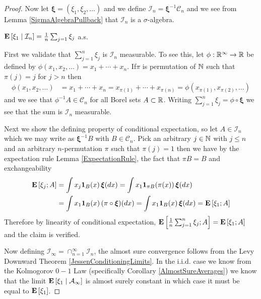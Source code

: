 \begin{proof}
Now let $\boldsymbol{\xi} = (\xi_1, \xi_2, \dotsc)$ and we define $\mathcal{I}_n = \boldsymbol{\xi}^{-1} \mathcal{C}_n$ and we see from Lemma \ref{SigmaAlgebraPullback} that $\mathcal{I}_n$ is a $\sigma$-algebra.
\begin{clm}$\cexpectationlong{\mathcal{I}_n}{\xi_1} = \frac{1}{n} \sum_{j=1} \xi_j$ a.s.
\end{clm}
First we validate that $\sum_{j=1}^n \xi_j$ is $\mathcal{I}_n$ measurable.  To see this, let $\phi : \reals^\infty \to \reals$ be defined by $\phi(x_1, x_2, \dots) = x_1 + \dotsb + x_n$.  If$\pi$ is permutation of $\naturals$ such that $\pi(j) = j$ for $j > n$ then 
\begin{align*}
\phi(x_1, x_2, \dotsc ) &= x_1 + \dotsb + x_n = x_{\pi(1)} + \dotsb + x_{\pi(n)} = \phi(x_{\pi(1)}, x_{\pi(2)}, \dotsc)
\end{align*}
and we see that $\phi^{-1} A \in \mathcal{C}_n$ for all Borel sets $A \subset \reals$.  Writing $\sum_{j=1}^n \xi_j = \phi \circ \boldsymbol{\xi}$ we see that the sum is $\mathcal{I}_n$ measurable.  

Next we show the defining property of conditional expectation, so let $A \in \mathcal{I}_n$ which we may write as $\boldsymbol{\xi}^{-1} B$ with $B \in \mathcal{C}_n$.  Pick an arbitrary $j \in \naturals$ with $j \leq n$ and an arbitrary $n$-permutation $\pi$ such that $\pi (j) = 1$ then we have by the expectation rule Lemma \ref{ExpectationRule}, the fact that $\pi B = B$ and exchangeability
\begin{align*}
\expectation{\xi_j ; A} 
&= \int x_j \characteristic{B}(x) \, \boldsymbol{\xi}(dx) 
= \int x_1 \characteristic{\pi B}(\pi(x)) \, \boldsymbol{\xi}(dx) \\
&= \int x_1 \characteristic{B}(x) \, (\pi \circ \boldsymbol{\xi})(dx) 
= \int x_1 \characteristic{B}(x) \, \boldsymbol{\xi}(dx) 
= \expectation{\xi_1 ; A}
\end{align*}
Therefore by linearity of conditional expectation, $\expectation{\frac{1}{n} \sum_{j=1}^n \xi_j ; A} = \expectation{\xi_1 ; A}$ and the claim is verified.

Now defining $\mathcal{I}_\infty = \cap_{n=1}^\infty \mathcal{I}_n$, the almost sure convergence follows from the Levy Downward Theorem \ref{JessenConditioningLimits}.  In the i.i.d. case we know from the Kolmogorov $0-1$ Law (specifically Corollary \ref{AlmostSureAverages}) we know that the limit $\cexpectationlong{\mathcal{A}_\infty}{\xi_1}$ is almost surely constant in which case it must be equal to $\expectation{\xi_1}$.
\end{proof}


